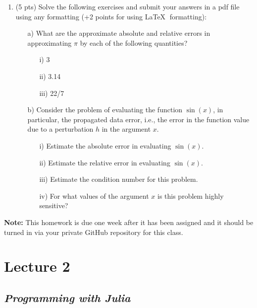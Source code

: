 \documentclass[11pt,a4paper,oneside]{report}
\begin{document}
\begin{enumerate}
\item (5 pts) Solve the following exercises and submit your answers in a pdf file using any formatting (+2 points for using \LaTeX $\;$ formatting):
\begin{enumerate}
\item[a) ]What are the approximate absolute and relative errors in approximating $\pi$ by each of the following quantities? 
\begin{enumerate}
\item[i) ]3
\item[ii) ]3.14
\item[iii) ]22/7
\end{enumerate}
\item[b) ]Consider the problem of evaluating the function $\sin(x)$, in particular, the propagated data error, i.e., the error in the function value due to a perturbation $h$ in the argument $x$.
\begin{enumerate}
\item[i) ]Estimate the absolute error in evaluating $\sin(x)$.
\item[ii) ]Estimate the relative error in evaluating $\sin(x)$.
\item[iii) ]Estimate the condition number for this problem.
\item[iv) ]For what values of the argument $x$ is this problem highly sensitive?\\
\end{enumerate}
\end{enumerate}
\end{enumerate}

{\bf Note: }This homework is due one week after it has been assigned and it should be turned in via your private GitHub repository for this class.
\newpage


\section*{Lecture 2}

{\center\color{magenta}
\subsection*{{\it\huge Programming with Julia}}}
\end{document}

